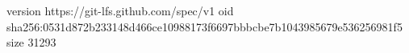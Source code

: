 version https://git-lfs.github.com/spec/v1
oid sha256:0531d872b233148d466ce10988173f6697bbbcbe7b1043985679e536256981f5
size 31293
